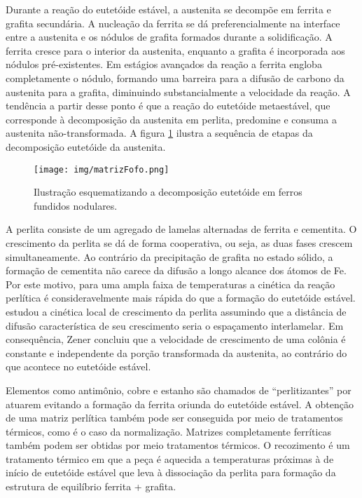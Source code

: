 Durante a reação do eutetóide estável, a austenita se decompõe em ferrita e grafita secundária. A nucleação da ferrita se dá preferencialmente na interface entre a austenita e os nódulos de grafita formados durante a solidificação. A ferrita cresce para o interior da austenita, enquanto a grafita é incorporada aos nódulos pré-existentes. Em estágios avançados da reação a ferrita engloba completamente o nódulo, formando uma barreira para a difusão de carbono da austenita para a grafita, diminuindo substancialmente a velocidade da reação. A tendência a partir desse ponto é que a reação do eutetóide metaestável, que corresponde à decomposição da austenita em perlita, predomine e consuma a austenita não-transformada. A figura \ref{matrizFofo} ilustra a sequência de etapas da decomposição eutetóide da austenita.

\begin{figure}
	\texttt{[image: img/matrizFofo.png]}
	\caption{Ilustração esquematizando a decomposição eutetóide em ferros fundidos nodulares\cite{Johnson1978}.}
	\label{matrizFofo}
\end{figure}

A perlita consiste de um agregado de lamelas alternadas de ferrita e cementita. O crescimento da perlita se dá de forma cooperativa, ou seja, as duas fases crescem simultaneamente. Ao contrário da precipitação de grafita no estado sólido, a formação de cementita não carece da difusão a longo alcance dos átomos de Fe. Por este motivo, para uma ampla faixa de temperaturas a cinética da reação perlítica é consideravelmente mais rápida do que a formação do eutetóide estável.  estudou a cinética local de crescimento da perlita assumindo que a distância de difusão característica de seu crescimento seria o espaçamento interlamelar. Em consequência, Zener concluiu que a velocidade de crescimento de uma colônia é constante e independente da porção transformada da austenita, ao contrário do que acontece no eutetóide estável.

Elementos como antimônio, cobre e estanho são chamados de ``perlitizantes'' por atuarem evitando a formação da ferrita oriunda do eutetóide estável\cite{Kovacs1981}.
A obtenção de uma matriz perlítica também pode ser conseguida por meio de tratamentos térmicos, como é o caso da normalização. Matrizes completamente ferríticas também podem ser obtidas por meio tratamentos térmicos. O recozimento é um tratamento térmico em que a peça é aquecida a temperaturas próximas à de início de eutetóide estável que leva à dissociação da perlita para formação da estrutura de equilíbrio ferrita + grafita\cite{Guesser2009}.

